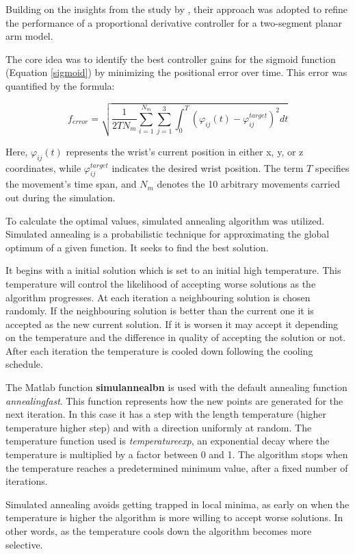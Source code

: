 Building on the insights from the study by \cite{PDP}, their approach was adopted to refine the performance of a proportional derivative controller for a two-segment planar arm model.

The core idea was to identify the best controller gains for the sigmoid function (Equation \ref{sigmoid}) by minimizing the positional error over time. This error was quantified by the formula:

\begin{equation}
f_{error} = \sqrt{\frac{1}{2TN_m}\sum_{i=1}^{N_m}\sum_{j=1}^{3}\int_{0}^{T}(\varphi_{ij}(t)-\varphi_{ij}^{target})^2 dt}
\end{equation}

Here, $\varphi_{ij}(t)$ represents the wrist's current position in either x, y, or z coordinates, while $\varphi_{ij}^{target}$ indicates the desired wrist position. The term $T$ specifies the movement's time span, and $N_m$ denotes the 10 arbitrary movements carried out during the simulation.

To calculate the optimal values, simulated annealing algorithm \cite{SimulatedAnnealing} was utilized. Simulated annealing is a probabilistic technique for approximating the global optimum of a given function. It seeks to find the best solution. 

It begins with a initial solution which is set to an initial high temperature. This temperature will control the likelihood of accepting worse solutions as the algorithm progresses. At each iteration a neighbouring solution is chosen randomly. If the neighbouring solution is better than the current one it is accepted as the new current solution. If it is worsen it may accept it depending on the temperature and the difference in quality of accepting the solution or not. After each iteration the temperature is cooled down following the cooling schedule. 


The Matlab function \textbf{simulannealbn} is used with the default annealing function \textit{annealingfast}. This function represents how the new points are generated for the next iteration. In this case it has a step with the length temperature (higher temperature higher step) and with a direction uniformly at random. The temperature function used is \textit{temperatureexp}, an exponential decay where the temperature is multiplied by a factor between 0 and 1. The algorithm stops when the temperature reaches a predetermined minimum value, after a fixed number of iterations. 

Simulated annealing avoids getting trapped in local minima, as early on when the temperature is higher the algorithm is more willing to accept worse solutions. In other words, as the temperature cools down the algorithm becomes more selective. 

